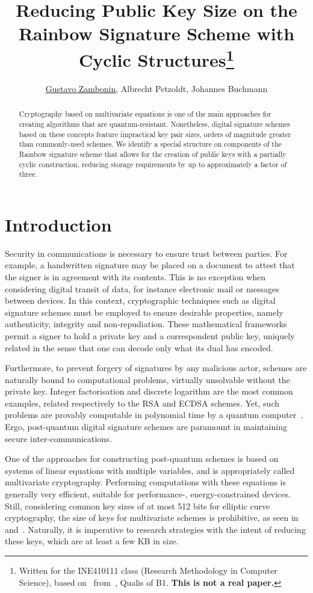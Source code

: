 \documentclass[11pt]{article}
\title{Reducing Public Key Size on the Rainbow Signature Scheme with Cyclic
    Structures\footnote{Written for the INE410111 class (Research Methodology
    in Computer Science), based on~\cite{Petzoldt:inproc:2010:dec}
    from~\cite{Petzoldt:phd:2013:jul}, Qualis of B1.
    \textbf{This is not a real paper.}}}
\author{\underline{Gustavo Zambonin}\inst{1}, Albrecht Petzoldt\inst{2},
    Johannes Buchmann\inst{2}}
\begin{document}
\maketitle

\begin{abstract}
  Cryptography based on multivariate equations is one of the main approaches
  for creating algorithms that are quantum-resistant. Nonetheless, digital
  signature schemes based on these concepts feature impractical key pair sizes,
  orders of magnitude greater than commonly-used schemes. We identify a special
  structure on components of the Rainbow signature scheme that allows for the
  creation of public keys with a partially cyclic construction, reducing
  storage requirements by up to approximately a factor of three.
\end{abstract}

\section{Introduction}\label{sec:intro}

Security in communications is necessary to ensure trust between parties. For
example, a handwritten signature may be placed on a document to attest that the
signer is in agreement with its contents. This is no exception when considering
digital transit of data, for instance electronic mail or messages between
devices. In this context, cryptographic techniques such as digital signature
schemes must be employed to ensure desirable properties, namely authenticity,
integrity and non-repudiation. These mathematical frameworks permit a signer to
hold a private key and a correspondent public key, uniquely related in the
sense that one can decode only what its dual has encoded.

Furthermore, to prevent forgery of signatures by any malicious actor, schemes
are naturally bound to computational problems, virtually unsolvable without the
private key. Integer factorisation and discrete logarithm are the most common
examples, related respectively to the RSA and ECDSA schemes. Yet, such problems
are provably computable in polynomial time by a quantum
computer~\cite{Shor:article:1997:oct}. Ergo, post-quantum digital signature
schemes are paramount in maintaining secure inter-communications.

One of the approaches for constructing post-quantum schemes is based on systems
of linear equations with multiple variables, and is appropriately called
multivariate cryptography. Performing computations with these equations is
generally very efficient, suitable for performance-, energy-constrained
devices. Still, considering common key sizes of at most 512 bits for elliptic
curve cryptography, the size of keys for multivariate schemes is prohibitive,
as seen in~\cite[Table 6.4]{Petzoldt:phd:2013:jul} and~\cite[Table
1]{Ding:article:2017:jul}. Naturally, it is imperative to research strategies
with the intent of reducing these keys, which are at least a few KB in size.
\end{document}
